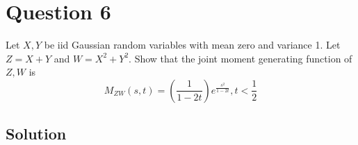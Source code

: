 \section*{Question 6}

Let \( X, Y \) be iid Gaussian random variables with mean zero and variance 1.
Let \( Z=X+Y \) and \( W=X^{2}+Y^{2} \).
Show that the joint moment generating function of \( Z, W \) is
\[
    M_{Z W}(s, t)=\left(\frac{1}{1-2 t}\right) e^{\frac{s^{2}}{1-2 t}}, t<\frac{1}{2}
\]

\subsection*{Solution}
